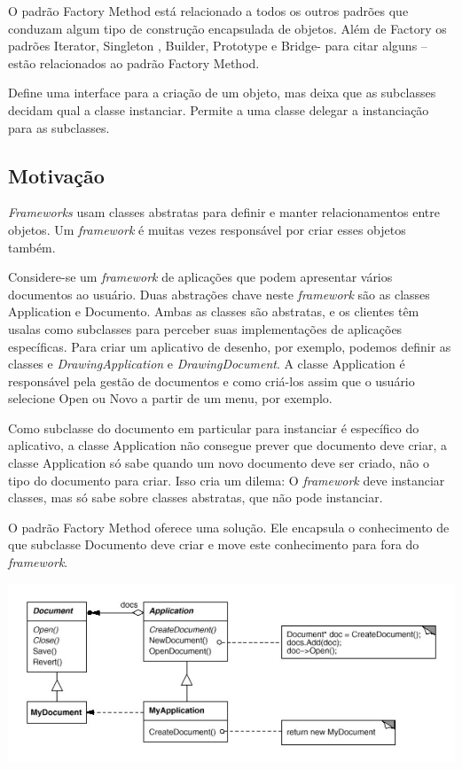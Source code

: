 O padrão Factory Method está relacionado a todos os outros padrões que conduzam
algum tipo de construção encapsulada de objetos. Além de Factory os padrões Iterator,
Singleton , Builder, Prototype e Bridge- para citar alguns – estão relacionados ao padrão
Factory Method.

Define uma interface para a criação de um objeto, mas deixa que as subclasses
decidam qual a classe instanciar. Permite a uma classe delegar a instanciação para as
subclasses.\cite{gamma95}


\subsection{Motivação}
\label{sub:fac_motiv}

\emph{Frameworks} usam classes abstratas para definir e manter relacionamentos entre
objetos. Um \emph{framework} é muitas vezes responsável por criar esses objetos também.

Considere-se um \emph{framework} de aplicações que podem apresentar vários documentos ao
usuário. Duas abstrações chave neste \emph{framework} são as classes Application e
Documento. Ambas as classes são abstratas, e os clientes têm usalas como subclasses para perceber
suas implementações de aplicações específicas. Para criar um aplicativo de desenho, por
exemplo, podemos definir as classes e \emph{DrawingApplication} e \emph{DrawingDocument}. A
classe Application é responsável pela gestão de documentos e como criá-los assim que o usuário selecione Open ou Novo a partir de um menu, por exemplo.\cite{gamma95}

Como subclasse do documento em particular para instanciar é específico do aplicativo,
a classe Application não consegue prever que documento deve criar, a classe Application só sabe quando um novo documento deve ser criado, não o tipo do documento para criar. Isso cria um dilema: O \emph{framework} deve instanciar classes, mas só sabe sobre classes abstratas, que não pode instanciar.\cite{gamma95}

O padrão Factory Method oferece uma solução. Ele encapsula o conhecimento de
que subclasse Documento deve criar e move este conhecimento para fora do \emph{framework}.\cite{gamma95}

\begin{center}
	\includegraphics[scale=0.40]{Figuras/image1.jpg}
	\label{fig:diagrama1}
\end{center}

